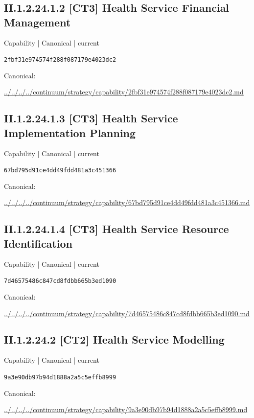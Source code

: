 \documentclass[10pt,a4paper]{article}
\begin{document}
\subsection*{II.1.2.24.1.2 [CT3] Health Service Financial Management}
{\small Capability | Canonical | current}\par
\texttt{2fbf31e974574f288f087179e4023dc2}\par
Canonical: \par
{\footnotesize\url{../../../../continuum/strategy/capability/2fbf31e974574f288f087179e4023dc2.md}}\par
\subsection*{II.1.2.24.1.3 [CT3] Health Service Implementation Planning}
{\small Capability | Canonical | current}\par
\texttt{67bd795d91ce4dd49fdd481a3c451366}\par
Canonical: \par
{\footnotesize\url{../../../../continuum/strategy/capability/67bd795d91ce4dd49fdd481a3c451366.md}}\par
\subsection*{II.1.2.24.1.4 [CT3] Health Service Resource Identification}
{\small Capability | Canonical | current}\par
\texttt{7d46575486c847cd8fdbb665b3ed1090}\par
Canonical: \par
{\footnotesize\url{../../../../continuum/strategy/capability/7d46575486c847cd8fdbb665b3ed1090.md}}\par
\subsection*{II.1.2.24.2 [CT2] Health Service Modelling}
{\small Capability | Canonical | current}\par
\texttt{9a3e90db97b94d1888a2a5c5effb8999}\par
Canonical: \par
{\footnotesize\url{../../../../continuum/strategy/capability/9a3e90db97b94d1888a2a5c5effb8999.md}}\par
\end{document}

